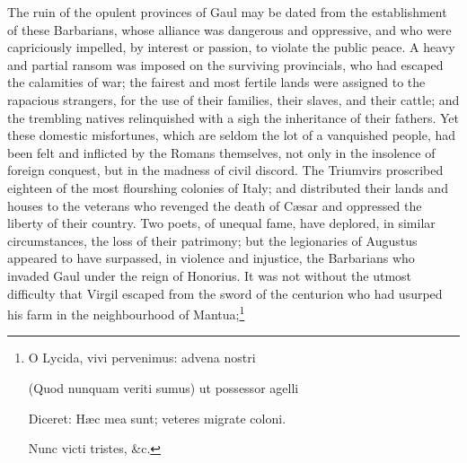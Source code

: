 The ruin of the opulent provinces of Gaul may be dated from the establishment of these Barbarians, whose alliance was dangerous and oppressive, and who were capriciously impelled, by interest or passion, to violate the public peace. A heavy and partial ransom was imposed on the surviving provincials, who had escaped the calamities of war; the fairest and most fertile lands were assigned to the rapacious strangers, for the use of their families, their slaves, and their cattle; and the trembling natives relinquished with a sigh the inheritance of their fathers. Yet these domestic misfortunes, which are seldom the lot of a vanquished people, had been felt and inflicted by the Romans themselves, not only in the insolence of foreign conquest, but in the madness of civil discord. The Triumvirs proscribed eighteen of the most flourshing colonies of Italy; and distributed their lands and houses to the veterans who revenged the death of Cæsar and oppressed the liberty of their country. Two poets, of unequal fame, have deplored, in similar circumstances, the loss of their patrimony; but the legionaries of Augustus appeared to have surpassed, in violence and injustice, the Barbarians who invaded Gaul under the reign of Honorius. It was not without the utmost difficulty that Virgil escaped from the sword of the centurion who had usurped his farm in the neighbourhood of Mantua;\footnote{O Lycida, vivi pervenimus: advena nostri

(Quod nunquam veriti sumus) ut possessor agelli

Diceret: Hæc mea sunt; veteres migrate coloni.

Nunc victi tristes, \&c.

}

